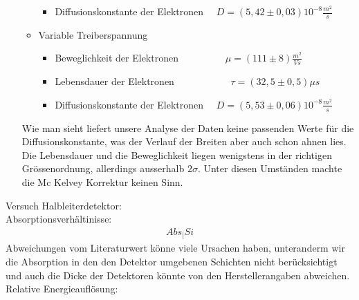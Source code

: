 \documentclass[12pt]{article}
\begin{document}
\begin{itemize}
\begin{itemize}
\begin{itemize}
 \item Diffusionskonstante der Elektronen ~~$D = (5,42 \pm 0,03) 10^{-8} \frac{m^2}{s}$
\end{itemize}
\item Variable Treiberspannung
\begin{itemize}
 \item Beweglichkeit der Elektronen ~~~~~~~~~$\mu = (111 \pm 8) \frac{m^2}{Vs}$ 
 \item Lebensdauer der Elektronen ~~~~~~~~~~~$\tau = (32,5 \pm 0,5) \mu s $
 \item Diffusionskonstante der Elektronen ~~$D = (5,53 \pm 0,06) 10^{-8} \frac{m^2}{s}$
\end{itemize}
\end{itemize}
Wie man sieht liefert unsere Analyse der Daten keine passenden Werte für die Diffusionskonstante, was der Verlauf der Breiten aber auch schon ahnen lies. Die Lebensdauer und die Beweglichkeit liegen wenigstens in der richtigen Grössenordnung, allerdings ausserhalb $2\sigma$. Unter diesen Umständen machte die Mc Kelvey Korrektur keinen Sinn.
\end{itemize}

Versuch Halbleiterdetektor: \\

Absorptionsverhältinisse: 
\begin{align*}
 Abs_[Si
\end{align*}
Abweichungen vom Literaturwert könne viele Ursachen haben, unteranderm wir die Absorption in den den Detektor umgebenen Schichten nicht berücksichtigt und auch die Dicke der Detektoren könnte von den Herstellerangaben abweichen.\\

Relative Energieauflösung:
\end{document}
